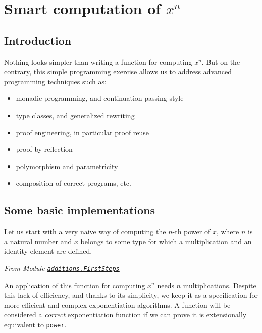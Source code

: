 \chapter{Smart computation of \texorpdfstring{$x^n$}{Powers}}
\label{chapter-powers}
\section{Introduction}

Nothing looks simpler than writing a function for computing $x^n$.
But on the contrary, this simple programming exercise allows us to address
advanced programming techniques such as:
\begin{itemize}
\item monadic programming, and continuation passing style
\item type classes, and generalized rewriting
\item proof engineering, in particular proof reuse
\item proof by reflection
\item polymorphism and parametricity
\item composition of correct programs, etc.
\end{itemize}



\section{Some basic implementations}
\label{sect:linear-naive}
Let us start with a very naive way of computing the $n$-th power of $x$, where
$n$ is a natural number and $x$ belongs to some type for which a multiplication and an identity element are defined.


\emph{From Module 
\href{../theories/html/additions.FirstSteps.html}{\texttt{additions.FirstSteps}}}
\label{sect: power-definitions}


An application of this function for  computing $x^n$ needs $n$ multiplications.
 Despite this lack of efficiency, and thanks to its simplicity, we keep it as a specification for more efficient and complex exponentiation algorithms.
A function will be considered a \emph{correct} exponentiation function if we can prove it is extensionally equivalent to \texttt{power}.



